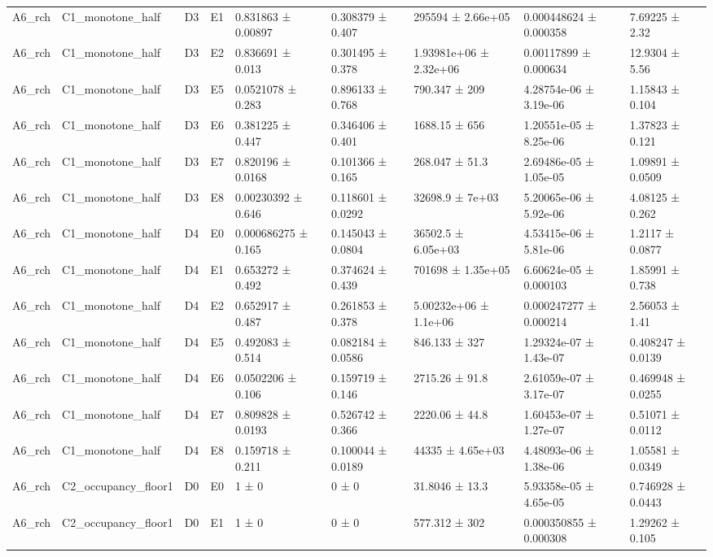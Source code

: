 \begin{table}
\begin{tabular}{lllllllll}
A6\_rch & C1\_monotone\_half & D3 & E1 & 0.831863 ± 0.00897 & 0.308379 ± 0.407 & 295594 ± 2.66e+05 & 0.000448624 ± 0.000358 & 7.69225 ± 2.32 \\
A6\_rch & C1\_monotone\_half & D3 & E2 & 0.836691 ± 0.013 & 0.301495 ± 0.378 & 1.93981e+06 ± 2.32e+06 & 0.00117899 ± 0.000634 & 12.9304 ± 5.56 \\
A6\_rch & C1\_monotone\_half & D3 & E5 & 0.0521078 ± 0.283 & 0.896133 ± 0.768 & 790.347 ± 209 & 4.28754e-06 ± 3.19e-06 & 1.15843 ± 0.104 \\
A6\_rch & C1\_monotone\_half & D3 & E6 & 0.381225 ± 0.447 & 0.346406 ± 0.401 & 1688.15 ± 656 & 1.20551e-05 ± 8.25e-06 & 1.37823 ± 0.121 \\
A6\_rch & C1\_monotone\_half & D3 & E7 & 0.820196 ± 0.0168 & 0.101366 ± 0.165 & 268.047 ± 51.3 & 2.69486e-05 ± 1.05e-05 & 1.09891 ± 0.0509 \\
A6\_rch & C1\_monotone\_half & D3 & E8 & 0.00230392 ± 0.646 & 0.118601 ± 0.0292 & 32698.9 ± 7e+03 & 5.20065e-06 ± 5.92e-06 & 4.08125 ± 0.262 \\
A6\_rch & C1\_monotone\_half & D4 & E0 & 0.000686275 ± 0.165 & 0.145043 ± 0.0804 & 36502.5 ± 6.05e+03 & 4.53415e-06 ± 5.81e-06 & 1.2117 ± 0.0877 \\
A6\_rch & C1\_monotone\_half & D4 & E1 & 0.653272 ± 0.492 & 0.374624 ± 0.439 & 701698 ± 1.35e+05 & 6.60624e-05 ± 0.000103 & 1.85991 ± 0.738 \\
A6\_rch & C1\_monotone\_half & D4 & E2 & 0.652917 ± 0.487 & 0.261853 ± 0.378 & 5.00232e+06 ± 1.1e+06 & 0.000247277 ± 0.000214 & 2.56053 ± 1.41 \\
A6\_rch & C1\_monotone\_half & D4 & E5 & 0.492083 ± 0.514 & 0.082184 ± 0.0586 & 846.133 ± 327 & 1.29324e-07 ± 1.43e-07 & 0.408247 ± 0.0139 \\
A6\_rch & C1\_monotone\_half & D4 & E6 & 0.0502206 ± 0.106 & 0.159719 ± 0.146 & 2715.26 ± 91.8 & 2.61059e-07 ± 3.17e-07 & 0.469948 ± 0.0255 \\
A6\_rch & C1\_monotone\_half & D4 & E7 & 0.809828 ± 0.0193 & 0.526742 ± 0.366 & 2220.06 ± 44.8 & 1.60453e-07 ± 1.27e-07 & 0.51071 ± 0.0112 \\
A6\_rch & C1\_monotone\_half & D4 & E8 & 0.159718 ± 0.211 & 0.100044 ± 0.0189 & 44335 ± 4.65e+03 & 4.48093e-06 ± 1.38e-06 & 1.05581 ± 0.0349 \\
A6\_rch & C2\_occupancy\_floor1 & D0 & E0 & 1 ± 0 & 0 ± 0 & 31.8046 ± 13.3 & 5.93358e-05 ± 4.65e-05 & 0.746928 ± 0.0443 \\
A6\_rch & C2\_occupancy\_floor1 & D0 & E1 & 1 ± 0 & 0 ± 0 & 577.312 ± 302 & 0.000350855 ± 0.000308 & 1.29262 ± 0.105 \\

\end{tabular}
\end{table}
